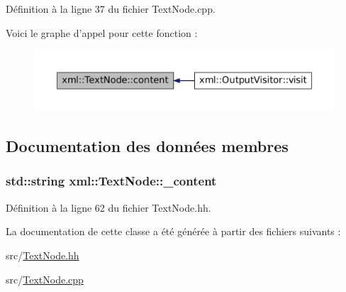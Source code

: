 Définition à la ligne 37 du fichier TextNode.cpp.



Voici le graphe d'appel pour cette fonction :
\nopagebreak
\begin{figure}[H]
\begin{center}
\leavevmode
\includegraphics[width=400pt]{classxml_1_1_text_node_a25941b48615a65258cc17d85bc0691d1_icgraph}
\end{center}
\end{figure}




\subsection{Documentation des données membres}
\hypertarget{classxml_1_1_text_node_a1c237e716b3f9fd76569d443d838cd25}{
\subsubsection[{\_\-content}]{\setlength{\rightskip}{0pt plus 5cm}std::string {\bf xml::TextNode::\_\-content}}}
\label{classxml_1_1_text_node_a1c237e716b3f9fd76569d443d838cd25}


Définition à la ligne 62 du fichier TextNode.hh.



La documentation de cette classe a été générée à partir des fichiers suivants :\begin{DoxyCompactItemize}
\item 
src/\hyperlink{_text_node_8hh}{TextNode.hh}\item 
src/\hyperlink{_text_node_8cpp}{TextNode.cpp}\end{DoxyCompactItemize}
